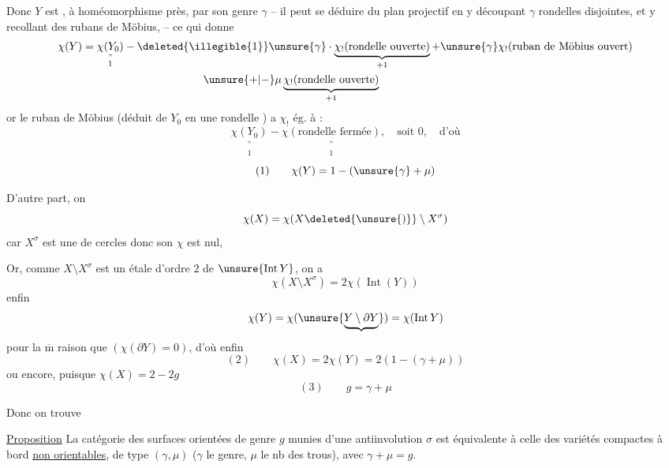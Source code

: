 
Donc $Y$ est , à homéomorphisme près, par son genre $\gamma$  -- il peut se déduire du plan projectif  en y découpant $\gamma$ rondelles disjointes, et y recollant des rubans de Möbius,  -- ce qui donne
\[
\begin{aligned}
\chi(Y)&=\underset{\substack{\text{''}\\1}}{\chi(Y_0)}
-\deleted{\illegible{1}}\unsure{\gamma}\cdot
\underbrace{\chi_!(\text{rondelle ouverte})}_{+1}
+\unsure{\gamma}\chi_!(\text{ruban de Möbius ouvert})\\
&\hspace{11em}\unsure{+|-}\mu\underbrace{\chi_!(\text{rondelle ouverte})}_{+1}
\end{aligned}
\]
or le ruban de Möbius  (déduit de $Y_0$ en  une rondelle ) a  $\chi_!$ ég. à :
\[
\underset{\substack{\text{''}\\1}}{\chi(Y_0)}-
\underset{\substack{\text{''}\\1}}{\chi(\text{rondelle fermée})},
\quad \text{soit }0,\quad \text{d'où}
\]
\[
(1)\qquad \chi(Y)=1-(\unsure{\gamma}+\mu)
\]

D'autre part, on 
\[
\chi(X)=\chi(X\deleted{\unsure{)}}\setminus X^\sigma)
\]
car $X^\sigma$ est une  de cercles donc son $\chi$ est nul,


Or, comme $X\setminus X^\sigma$ est un  étale d'ordre $2$ de $\unsure{\operatorname{Int}Y}$, on a
\[
\chi(X\setminus X^\sigma)=2\chi(\operatorname{Int}(Y))
\]
enfin
\[
\chi(Y)=\chi(\unsure{\underbrace{Y\setminus\partial Y}})=\chi(\operatorname{Int}Y)
\]
pour la $\overline{\mathrm m}$ raison que  $(\chi(\partial Y)=0)$,
d'où enfin
\[
(2)\qquad \chi(X)=2\chi(Y)=2(1-(\gamma+\mu))
\]
 ou encore, puisque $\chi(X)=2-2g$
\[
(3)\qquad g=\gamma+\mu
\]

Donc on trouve


\uline{Proposition} La catégorie des surfaces orientées  de genre $g$ munies d'une antiinvolution $\sigma$ est équivalente à celle des variétés compactes à bord \uline{non orientables}, de type $(\gamma,\mu)$ ($\gamma$ le genre, $\mu$ le nb des trous), avec $\gamma+\mu=g$.

